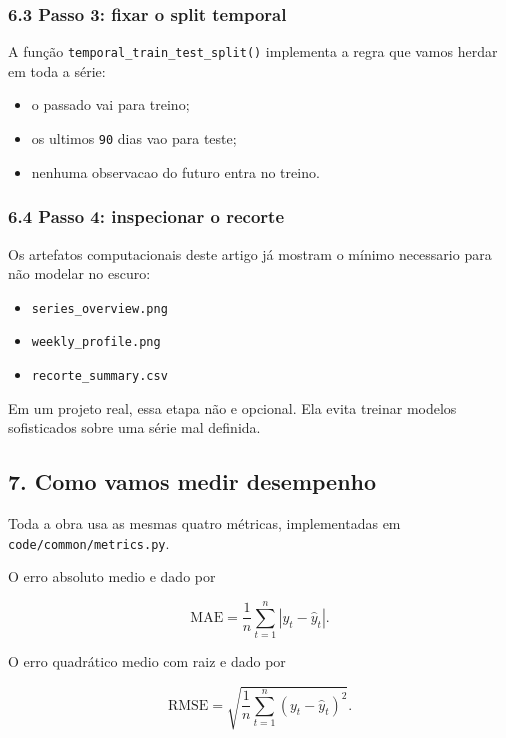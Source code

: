 \documentclass[12pt]{article}
\providecommand{\tightlist}{%
          \setlength{\itemsep}{0pt}\setlength{\parskip}{0pt}}
\begin{document}
\subsubsection{6.3 Passo 3: fixar o split temporal}\label{63-passo-3-fixar-o-split-temporal}

A função \texttt{temporal\_train\_test\_split()} implementa a regra que vamos herdar em toda a série:

\begin{itemize}
\tightlist
\item
  o passado vai para treino;
\item
  os ultimos \texttt{90} dias vao para teste;
\item
  nenhuma observacao do futuro entra no treino.
\end{itemize}

\subsubsection{6.4 Passo 4: inspecionar o recorte}\label{64-passo-4-inspecionar-o-recorte}

Os artefatos computacionais deste artigo já mostram o mínimo necessario para não modelar no escuro:

\begin{itemize}
\tightlist
\item
  \texttt{series\_overview.png}
\item
  \texttt{weekly\_profile.png}
\item
  \texttt{recorte\_summary.csv}
\end{itemize}

Em um projeto real, essa etapa não e opcional. Ela evita treinar modelos sofisticados sobre uma série mal definida.

\subsection{7. Como vamos medir desempenho}\label{7-como-vamos-medir-desempenho}

Toda a obra usa as mesmas quatro métricas, implementadas em \texttt{code/common/metrics.py}.

O erro absoluto medio e dado por

\[
\mathrm{MAE} = \frac{1}{n} \sum_{t=1}^n |y_t - \hat{y}_t|.
\]

O erro quadrático medio com raiz e dado por

\[
\mathrm{RMSE} = \sqrt{\frac{1}{n} \sum_{t=1}^n (y_t - \hat{y}_t)^2}.
\]
\end{document}
